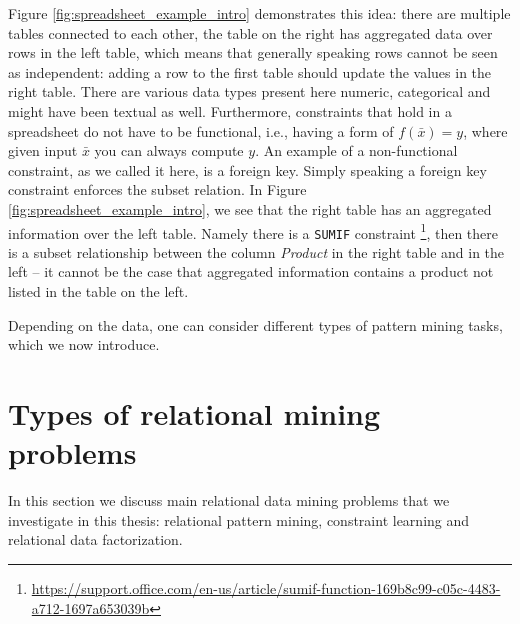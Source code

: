 Figure \ref{fig:spreadsheet_example_intro} demonstrates this idea:
there are multiple tables connected to each other, the table on the
right has aggregated data over rows in the left table, which means
that generally speaking rows cannot be seen as independent: adding a
row to the first table should update the values in the right table.
There are various data types present here numeric, categorical and
might have been textual as well. Furthermore, constraints that hold in
a spreadsheet do not have to be functional, i.e., having a form of
$f(\bar x) = y$, where given input $\bar x$ you can always compute
$y$. An example of a non-functional constraint, as we called it here,
is a foreign key. Simply speaking a foreign key constraint enforces
the subset relation. In Figure \ref{fig:spreadsheet_example_intro}, we
see that the right table has an aggregated information over the left
table. Namely there is a \texttt{SUMIF} constraint \footnote{\url{https://support.office.com/en-us/article/sumif-function-169b8c99-c05c-4483-a712-1697a653039b}}, then there is a subset relationship between the column \textit{Product} in the right table and in the left -- it cannot be the case that aggregated information contains a product not listed in the table on the left.
\pubrevend

Depending on the data, one can consider different types of pattern
mining tasks, which we now introduce.

\section{Types of relational mining problems}\label{sec:rel_problems}
In this section we discuss main relational data mining problems that
we investigate in this thesis: relational pattern mining, constraint learning
and relational data factorization.




